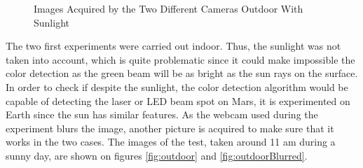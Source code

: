 \begin{figure}[!h] 
\centering
{}
\quad 
\quad 
{}
\caption{Images Acquired by the Two Different Cameras Outdoor With Sunlight} 
\end{figure}

The two first experiments were carried out indoor. Thus, the sunlight was not taken into account, which is quite problematic since it could make impossible the color detection as the green beam will be as bright as the sun rays on the surface. In order to check if despite the sunlight, the color detection algorithm would be capable of detecting the laser or LED beam spot on Mars, it is experimented on Earth since the sun has similar features. As the webcam used during the experiment blurs the image, another picture is acquired to make sure that it works in the two cases. The images of the test, taken around 11 am during a sunny day, are shown on figures \ref{fig:outdoor} and \ref{fig:outdoorBlurred}.

